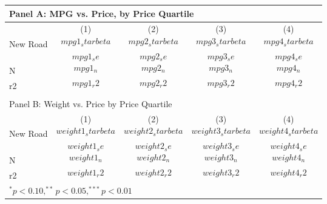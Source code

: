 \begin{tabular}{l*{4}{c}}
\multicolumn{5}{p{\linewidth}}{Panel A: MPG vs. Price, by Price Quartile} \\
\hline\hline
                    &         (1)   &         (2)   &         (3)   &         (4)    \\
\hline
New Road            &     $$mpg1_starbeta$$  &     $$mpg2_starbeta$$  &     $$mpg3_starbeta$$  &     $$mpg4_starbeta$$  \\
                    &     $$mpg1_se$$        &     $$mpg2_se$$        &     $$mpg3_se$$        &     $$mpg4_se$$        \\
N                   &       $$mpg1_n$$       &       $$mpg2_n$$       &       $$mpg3_n$$       &       $$mpg4_n$$       \\
r2                  &          $$mpg1_r2$$   &          $$mpg2_r2$$   &          $$mpg3_r2$$   &          $$mpg4_r2$$   \\
\hline & & & & \\

\multicolumn{5}{p{\linewidth}}{Panel B: Weight vs. Price by Price Quartile} \\
\hline\hline
                    &         (1)   &         (2)   &         (3)   &         (4)    \\
\hline
New Road            &     $$weight1_starbeta$$  &     $$weight2_starbeta$$  &     $$weight3_starbeta$$  &     $$weight4_starbeta$$  \\
                    &     $$weight1_se$$        &     $$weight2_se$$        &     $$weight3_se$$        &     $$weight4_se$$        \\
N                   &       $$weight1_n$$       &       $$weight2_n$$       &       $$weight3_n$$       &       $$weight4_n$$       \\
r2                  &          $$weight1_r2$$   &          $$weight2_r2$$   &          $$weight3_r2$$   &          $$weight4_r2$$   \\
\hline
\multicolumn{5}{p{\linewidth}}{$^{*}p<0.10, ^{**}p<0.05, ^{***}p<0.01$} \\
\end{tabular}
